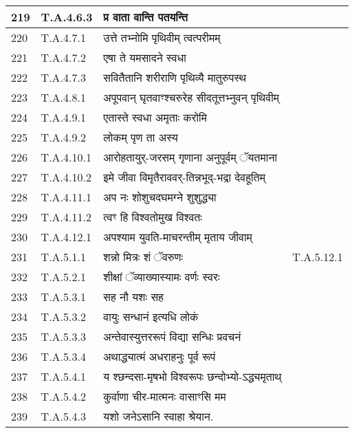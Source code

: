 \documentclass[17pt]{extarticle}
\begin{document}
\begin{longtable}{||p{0.4in}||p{0.9in}||p{4.0in}||p{0.9in}||}
            219 & T.A.4.6.3 & प्र वाता वान्ति पतयन्ति &      \\
        \hline
            220 & T.A.4.7.1 & उत्ते तभ्नोमि पृथिवीम् त्वत्परीमम् &      \\
        \hline
            221 & T.A.4.7.2 & एषा ते यमसादने स्वधा &      \\
        \hline
            222 & T.A.4.7.3 & सवितैतानि शरीराणि पृथिव्यै मातुरुपस्थ &      \\
        \hline
            223 & T.A.4.8.1 & अपूपवान् घृतवाꣳश्चरुरेह सीदतूत्तभ्नुवन् पृथिवीम् &      \\
        \hline
            224 & T.A.4.9.1 & एतास्ते स्वधा अमृताः करोमि &      \\
        \hline
            225 & T.A.4.9.2 & लोकम् पृण ता अस्य &      \\
        \hline
            226 & T.A.4.10.1 & आरोहतायुर्{-}जरसम् गृणाना अनुपूर्वम् ॅयतमाना &      \\
        \hline
            227 & T.A.4.10.2 & इमे जीवा विमृतैराववर्{-}तिन्नभूद्{-}भद्रा देवहूतिम् &      \\
        \hline
            228 & T.A.4.11.1 & अप नः शोशुचदघमग्ने शुशुद्ध्या &      \\
        \hline
            229 & T.A.4.11.2 & त्वꣳ हि विश्वतोमुख विश्वतः &      \\
        \hline
            230 & T.A.4.12.1 & अपश्याम युवति{-}माचरन्तीम् मृताय जीवाम् &      \\
        \hline
            231 & T.A.5.1.1 & शन्नो मित्रः शं ॅवरुणः &  T.A.5.12.1       \\
        \hline
            232 & T.A.5.2.1 & शीक्षां ॅव्याख्यास्यामः वर्णः स्वरः &      \\
        \hline
            233 & T.A.5.3.1 & सह नौ यशः सह &      \\
        \hline
            234 & T.A.5.3.2 & वायुः सन्धानं इत्यधि लोकं &      \\
        \hline
            235 & T.A.5.3.3 & अन्तेवास्युत्तररूपं विद्या सन्धिः प्रवचनं &      \\
        \hline
            236 & T.A.5.3.4 & अथाद्ध्यात्मं अधराहनुः पूर्व रूपं &      \\
        \hline
            237 & T.A.5.4.1 & य श्छन्दसा{-}मृषभो विश्वरूपः छन्दोभ्यो{-}ऽद्ध्यमृताथ् &      \\
        \hline
            238 & T.A.5.4.2 & कुर्वाणा चीर{-}मात्मनः वासाꣳसि मम &      \\
        \hline
            239 & T.A.5.4.3 & यशो जनेऽसानि स्वाहा श्रेयान. &      \\

\end{longtable}
\end{document}
